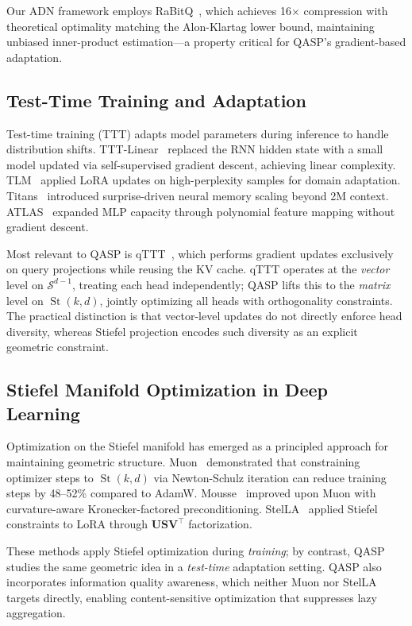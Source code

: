 \documentclass[twocolumn]{article}
\DeclareMathOperator{\St}{St}
\begin{document}
Our ADN framework employs RaBitQ~\cite{rabitq}, which achieves 16$\times$ compression with theoretical optimality matching the Alon-Klartag lower bound, maintaining unbiased inner-product estimation---a property critical for QASP's gradient-based adaptation.

\subsection{Test-Time Training and Adaptation}

Test-time training (TTT) adapts model parameters during inference to handle distribution shifts. TTT-Linear~\cite{tttlinear} replaced the RNN hidden state with a small model updated via self-supervised gradient descent, achieving linear complexity. TLM~\cite{tlm} applied LoRA updates on high-perplexity samples for domain adaptation. Titans~\cite{titans} introduced surprise-driven neural memory scaling beyond 2M context. ATLAS~\cite{atlas} expanded MLP capacity through polynomial feature mapping without gradient descent.

Most relevant to QASP is qTTT~\cite{qttt}, which performs gradient updates exclusively on query projections while reusing the KV cache. qTTT operates at the \emph{vector} level on $\mathcal{S}^{d-1}$, treating each head independently; QASP lifts this to the \emph{matrix} level on $\St(k,d)$, jointly optimizing all heads with orthogonality constraints. The practical distinction is that vector-level updates do not directly enforce head diversity, whereas Stiefel projection encodes such diversity as an explicit geometric constraint.

\subsection{Stiefel Manifold Optimization in Deep Learning}

Optimization on the Stiefel manifold has emerged as a principled approach for maintaining geometric structure. Muon~\cite{muon} demonstrated that constraining optimizer steps to $\St(k,d)$ via Newton-Schulz iteration can reduce training steps by 48--52\% compared to AdamW. Mousse~\cite{mousse} improved upon Muon with curvature-aware Kronecker-factored preconditioning. StelLA~\cite{stella} applied Stiefel constraints to LoRA through $\mathbf{U}\mathbf{S}\mathbf{V}^\top$ factorization.

These methods apply Stiefel optimization during \emph{training}; by contrast, QASP studies the same geometric idea in a \emph{test-time} adaptation setting. QASP also incorporates information quality awareness, which neither Muon nor StelLA targets directly, enabling content-sensitive optimization that suppresses lazy aggregation.
\end{document}
